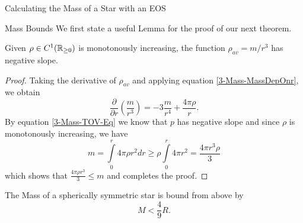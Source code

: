 \begin{section}{Calculating the Mass of a Star with an EOS}
\begin{subsection}{Mass Bounds}
We first state a useful Lemma for the proof of our next theorem.
\begin{lemma}
	Given $\rho\in C^1(\mathbb{R}_{\geq0})$ is monotonously increasing, the function $\rho_{av}=m/r^3$ has negative slope.
\end{lemma}
\begin{proof}
	Taking the derivative of $\rho_{av}$ and applying equation \eqref{3-Mass-MassDepOnr}, we obtain 
	\begin{equation}
		\frac{\partial}{\partial r}\left(\frac{m}{r^3}\right) = -3\frac{m}{r^4} + \frac{4\pi\rho}{r}.
	\end{equation}
	By equation \eqref{3-Mass-TOV-Eq} we know that $p$ has negative slope and since $\rho$ is monotonously increasing, we have
	\begin{equation}
		m = \int\limits_0^r 4\pi\rho r^2 dr \geq \rho\int\limits_0^r4\pi r^2 = \frac{4\pi r^3\rho}{3}
	\end{equation}
	which shows that $\frac{4\pi\rho r^3}{3}\leq m$ and completes the proof.
\end{proof}\noindent
\begin{theorem}
	The Mass of a spherically symmetric star is bound from above by
	\begin{equation}
		M < \frac{4}{9}R.
	\end{equation}
\end{theorem}

\end{subsection}
\end{section}
